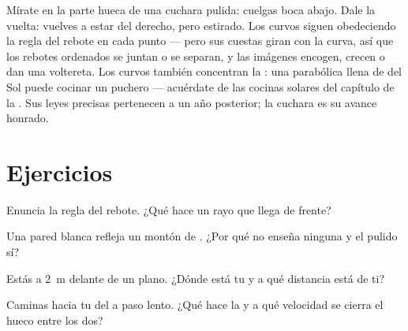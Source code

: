 \begin{remark}\label{rem:g5:mirrors-reflection:curved}
Mírate en la parte hueca de una cuchara pulida: cuelgas boca abajo.
Dale la vuelta: vuelves a estar del derecho, pero estirado. Los
 curvos siguen obedeciendo la regla del rebote en cada
punto --- pero sus cuestas giran con la curva, así que los rebotes
ordenados se juntan o se separan, y las imágenes encogen, crecen o
dan una voltereta. Los  curvos también concentran la :
una parabólica llena de  del Sol puede cocinar un puchero ---
acuérdate de las cocinas solares del capítulo de la . Sus
leyes precisas pertenecen a un año posterior; la cuchara es su avance
honrado.
\end{remark}

\section{Ejercicios}

\begin{exercise}[$\star$]\label{exo:g5:mirrors-reflection:1}
Enuncia la regla del rebote. ¿Qué hace un rayo que llega de frente?
\end{exercise}

\begin{exercise}[$\star$]\label{exo:g5:mirrors-reflection:2}
Una pared blanca refleja un montón de . ¿Por qué no enseña
ninguna  y el  pulido sí?
\end{exercise}

\begin{exercise}[$\star$]\label{exo:g5:mirrors-reflection:3}
Estás a \qty{2}{m} delante de un  plano. ¿Dónde está tu
 y a qué distancia está de ti?
\end{exercise}

\begin{exercise}[$\star$]\label{exo:g5:mirrors-reflection:4}
Caminas hacia tu  del  a paso lento. ¿Qué hace la
 y a qué velocidad se cierra el hueco entre los dos?
\end{exercise}

